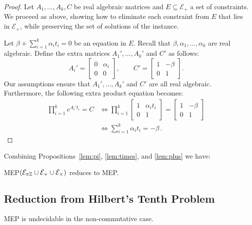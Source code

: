 \begin{proof}
  Let $A_1,\ldots,A_k,C$ be real algebraic matrices and
  $E \subseteq\mathcal{E}_{+}$ a set of constraints.
  We proceed as above, showing how to eliminate each constraint from
  $E$ that lies in $\mathcal{E}_{+}$, while preserving the set of
  solutions of the instance.

Let $\beta+\sum_{i=1}^k\alpha_it_i=0$ be an equation in $E$.
Recall that $\beta,\alpha_1,\ldots,\alpha_k$ are real algebraic.
Define the extra matrices $A_1',\ldots,A_k'$ and $C'$ as follows:
\[A_i'=\begin{bmatrix}0&\alpha_i\\0&0\end{bmatrix},
\qquad C'=\begin{bmatrix}1&-\beta\\0&1\end{bmatrix}.\]
Our assumptions ensure that $A_1',\ldots,A_k'$ and $C'$ are all real algebraic.
Furthermore, the following extra product equation becomes:
\begin{align*}
\prod_{i=1}^ke^{A_i't_i}=C
&\Leftrightarrow\prod_{i=1}^k\begin{bmatrix}1&\alpha_it_i\\0&1\end{bmatrix}=\begin{bmatrix}1&-\beta\\0&1\end{bmatrix}\\
&\Leftrightarrow\sum_{i=1}^k\alpha_it_i=-\beta \, .
\end{align*}
\end{proof}

Combining Propositions~\ref{lem:pi}, \ref{lem:times}, and \ref{lem:plus} we
have:
\begin{proposition}
  MEP$(\mathcal{E}_{\pi\mathbb{Z}}\cup\mathcal{E}_{+}\cup\mathcal{E}_{\times})$
  reduces to MEP.
\end{proposition}

\subsection{Reduction from Hilbert's Tenth Problem}

\begin{theorem}
  MEP is undecidable in the non-commutative case.
\end{theorem}

